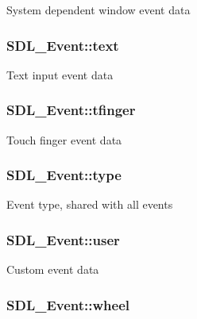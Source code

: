 System dependent window event data \hypertarget{union_s_d_l___event_aa4fc65c559d69f33c057c0c23d8414b8}{
\subsubsection[{text}]{ S\-D\-L\-\_\-\-Event\-::text}}\label{union_s_d_l___event_aa4fc65c559d69f33c057c0c23d8414b8}
Text input event data \hypertarget{union_s_d_l___event_ab18d7d60794cb056948ffa58541bc3c5}{
\subsubsection[{tfinger}]{ S\-D\-L\-\_\-\-Event\-::tfinger}}\label{union_s_d_l___event_ab18d7d60794cb056948ffa58541bc3c5}
Touch finger event data \hypertarget{union_s_d_l___event_a237648bec242d2d5835f1a4250ddfa46}{
\subsubsection[{type}]{ S\-D\-L\-\_\-\-Event\-::type}}\label{union_s_d_l___event_a237648bec242d2d5835f1a4250ddfa46}
Event type, shared with all events \hypertarget{union_s_d_l___event_ab7c394e3ce7bf1e4f8d68bc0e9f1b042}{
\subsubsection[{user}]{ S\-D\-L\-\_\-\-Event\-::user}}\label{union_s_d_l___event_ab7c394e3ce7bf1e4f8d68bc0e9f1b042}
Custom event data \hypertarget{union_s_d_l___event_a267d3f550715519ec90a81ccd0e6cbda}{
\subsubsection[{wheel}]{ S\-D\-L\-\_\-\-Event\-::wheel}}\label{union_s_d_l___event_a267d3f550715519ec90a81ccd0e6cbda}
